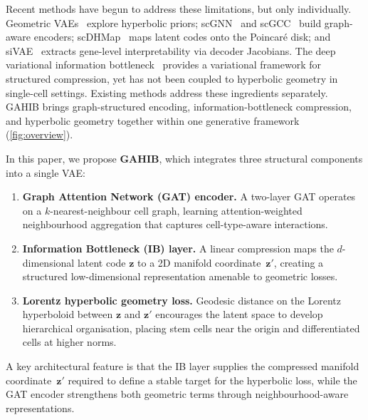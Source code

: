 \documentclass[preprint,12pt]{elsarticle}
\newcommand{\bz}{\mathbf{z}}
\begin{document}
Recent methods have begun to address these limitations, but only
individually.
Geometric VAEs~\cite{bayer2023gmvae} explore hyperbolic priors;
scGNN~\cite{wang2021scgnn} and scGCC~\cite{tian2023scgcc} build
graph-aware encoders;
scDHMap~\cite{tian2023scdhmap} maps latent codes onto the Poincar\'{e}
disk;
and siVAE~\cite{choi2023sivae} extracts gene-level interpretability via
decoder Jacobians.
The deep variational information bottleneck~\cite{alemi2017deep} provides
a variational framework for structured compression, yet has not been
coupled to hyperbolic geometry in single-cell settings.
Existing methods address these ingredients separately.
GAHIB brings graph-structured encoding, information-bottleneck
compression, and hyperbolic geometry together within one generative
framework (\cref{fig:overview}).

In this paper, we propose \textbf{GAHIB}, which integrates three
structural components into a single VAE:
\begin{enumerate}[leftmargin=*,itemsep=2pt]
\item \textbf{Graph Attention Network (GAT) encoder.}
  A two-layer GAT operates on a $k$-nearest-neighbour cell graph,
  learning attention-weighted neighbourhood aggregation that captures
  cell-type-aware interactions.
\item \textbf{Information Bottleneck (IB) layer.}
  A linear compression maps the $d$-dimensional latent code $\bz$ to a
  2D manifold coordinate~$\bz'$, creating a structured low-dimensional
  representation amenable to geometric losses.
\item \textbf{Lorentz hyperbolic geometry loss.}
  Geodesic distance on the Lorentz hyperboloid between $\bz$ and $\bz'$
  encourages the latent space to develop hierarchical organisation,
  placing stem cells near the origin and differentiated cells at higher
  norms.
\end{enumerate}

A key architectural feature is that the IB layer supplies the compressed
manifold coordinate~$\bz'$ required to define a stable target for the
hyperbolic loss, while the GAT encoder strengthens both geometric terms
through neighbourhood-aware representations.
\end{document}
